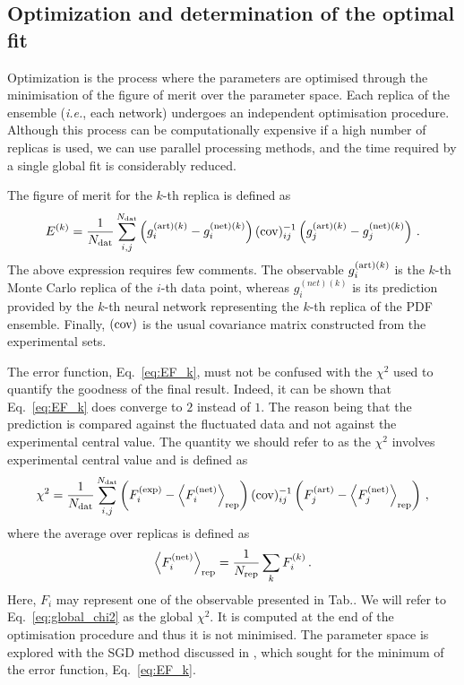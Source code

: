 \subsection*{Optimization and determination of the optimal fit}
Optimization is the process where the parameters are optimised through the minimisation of the figure of merit over the parameter space. Each replica of the ensemble (\textit{i.e.}, each network) undergoes an independent optimisation procedure. Although this process can be computationally expensive if a high number of replicas is used, we can use parallel processing methods, and the time required by a single global fit is considerably reduced.%

The figure of merit for the $k$-th replica is defined as
\begin{equation}
  E^{(k)} = \frac{1}{N_{\textrm{dat}}} \sum_{i,j}^{N_{\textrm{dat}}} \left( g_{i}^{\textrm{(art)}(k)} - g_{i}^{\textrm{(net)}(k)} \right) (\textrm{cov})^{-1}_{ij} \left( g_{j}^{\textrm{(art)}(k)} - g_{j}^{\textrm{(net)}(k)} \right) \,.
  \label{eq:EF_k}
\end{equation}
The above expression requires few comments. The observable $g_{i}^{\textrm{(art)}(k)}$ is the $k$-th Monte Carlo replica of the $i$-th data point, whereas $g_{i}^{(net)(k)}$ is its prediction provided by the $k$-th neural network representing the $k$-th replica of the PDF ensemble. Finally, $\textrm{(cov)}$ is the usual covariance matrix constructed from the experimental sets.%

The error function, Eq.~\eqref{eq:EF_k}, must not be confused with the $\chi^2$ used to quantify the goodness of the final result. Indeed, it can be shown that Eq.~\eqref{eq:EF_k} does converge to $2$ instead of $1$. The reason being that the prediction is compared against the fluctuated data and not against the experimental central value. The quantity we should refer to as the $\chi^2$ involves 
experimental central value and is defined as
\begin{equation}
  \chi^2 = \frac{1}{N_{\textrm{dat}}} \sum_{i,j}^{N_{\textrm{dat}}} \left( F_{i}^{\textrm{(exp)}} - \left<F_{i}^{\textrm{(net)}}\right>_{\textrm{rep}} \right) (\textrm{cov})^{-1}_{ij} \left( F_{j}^{\textrm{(art)}} - \left<F_{j}^{\textrm{(net)}}\right>_{\textrm{rep}} \right) \,,
  \label{eq:global_chi2}
\end{equation}
where the average over replicas is defined as
\begin{equation}
  \left< F_i^{\textrm{(net)}} \right>_{\textrm{rep}} = \frac{1}{N_{\textrm{rep}}} \sum_{k} F^{(k)}_i \,.
\end{equation}
Here, $F_i$ may represent one of the observable presented in Tab.. We will refer to Eq.~\eqref{eq:global_chi2} as the global $\chi^2$. It is computed at the end of the optimisation procedure and thus it is not minimised. The parameter space is explored with the SGD method discussed in , which sought for the minimum of the error function, Eq.~\eqref{eq:EF_k}.%

